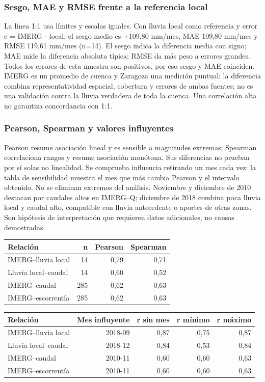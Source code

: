 \documentclass[10pt,a4paper]{article}
\begin{document}
\subsubsection*{Sesgo, MAE y RMSE frente a la referencia local}
La línea 1:1 usa límites y escalas iguales. Con lluvia local como referencia y error e = IMERG - local, el sesgo medio es +109,80 mm/mes, MAE 109,80 mm/mes y RMSE 119,61 mm/mes (n=14). El sesgo indica la diferencia media con signo; MAE mide la diferencia absoluta típica; RMSE da más peso a errores grandes. Todos los errores de esta muestra son positivos, por eso sesgo y MAE coinciden. IMERG es un promedio de cuenca y Zaragoza una medición puntual: la diferencia combina representatividad espacial, cobertura y errores de ambas fuentes; no es una validación contra la lluvia verdadera de toda la cuenca. Una correlación alta no garantiza concordancia con 1:1.
\subsubsection*{Pearson, Spearman y valores influyentes}
Pearson resume asociación lineal y es sensible a magnitudes extremas; Spearman correlaciona rangos y resume asociación monótona. Sus diferencias no prueban por sí solas no linealidad. Se comprueba influencia retirando un mes cada vez: la tabla de sensibilidad muestra el mes que más cambia Pearson y el intervalo obtenido. No se eliminan extremos del análisis. Noviembre y diciembre de 2010 destacan por caudales altos en IMERG--Q; diciembre de 2018 combina poca lluvia local y caudal alto, compatible con lluvia antecedente o aportes de otras zonas. Son hipótesis de interpretación que requieren datos adicionales, no causas demostradas.
\begin{center}\small\begin{tabular}{lrrr}\hline
Relación & n & Pearson & Spearman \\ \hline
IMERG--lluvia local & 14 & 0,79 & 0,71 \\
Lluvia local--caudal & 14 & 0,60 & 0,52 \\
IMERG--caudal & 285 & 0,62 & 0,63 \\
IMERG--escorrentía & 285 & 0,62 & 0,63 \\
\hline\end{tabular}\end{center}
\begin{center}\small\begin{tabular}{lrrrr}\hline
Relación & Mes influyente & r sin mes & r mínimo & r máximo \\ \hline
IMERG--lluvia local & 2018-09 & 0,87 & 0,75 & 0,87 \\
Lluvia local--caudal & 2018-12 & 0,84 & 0,53 & 0,84 \\
IMERG--caudal & 2010-11 & 0,60 & 0,60 & 0,63 \\
IMERG--escorrentía & 2010-11 & 0,60 & 0,60 & 0,63 \\
\hline\end{tabular}\end{center}
\end{document}

